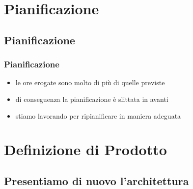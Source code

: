 
\section{Pianificazione}

\subsection*{Pianificazione}

\begin{frame}
\frametitle{Pianificazione}

\begin{itemize}
\item le ore erogate sono molto di più di quelle previste
\item di conseguenza la pianificazione è slittata in avanti
\item stiamo lavorando per ripianificare in maniera adeguata
\end{itemize}

\end{frame}

\section{Definizione di Prodotto}

\subsection*{Presentiamo di nuovo l'architettura}

